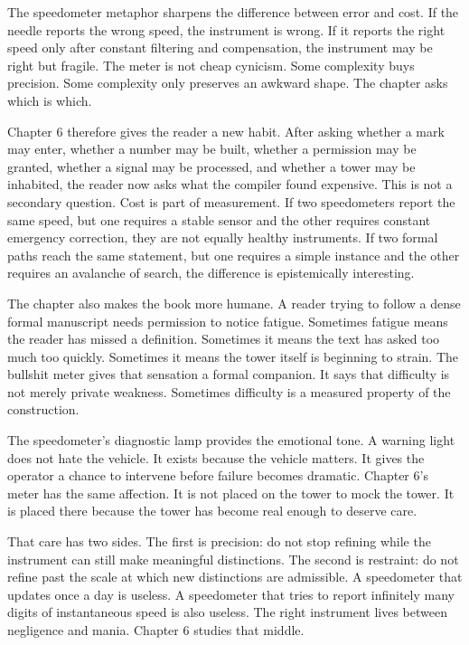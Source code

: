 The speedometer metaphor sharpens the difference between error and cost. If the
needle reports the wrong speed, the instrument is wrong. If it reports the right
speed only after constant filtering and compensation, the instrument may be
right but fragile. The meter is not cheap cynicism. Some complexity buys
precision. Some complexity only preserves an awkward shape. The chapter asks
which is which.

Chapter 6 therefore gives the reader a new habit. After asking whether a mark
may enter, whether a number may be built, whether a permission may be granted,
whether a signal may be processed, and whether a tower may be inhabited, the
reader now asks what the compiler found expensive. This is not a secondary
question. Cost is part of measurement. If two speedometers report the same
speed, but one requires a stable sensor and the other requires constant
emergency correction, they are not equally healthy instruments. If two formal
paths reach the same statement, but one requires a simple instance and the
other requires an avalanche of search, the difference is epistemically
interesting.

The chapter also makes the book more humane. A reader trying to follow a dense
formal manuscript needs permission to notice fatigue. Sometimes fatigue means
the reader has missed a definition. Sometimes it means the text has asked too
much too quickly. Sometimes it means the tower itself is beginning to strain.
The bullshit meter gives that sensation a formal companion. It says that
difficulty is not merely private weakness. Sometimes difficulty is a measured
property of the construction.

The speedometer's diagnostic lamp provides the emotional tone. A warning light
does not hate the vehicle. It exists because the vehicle matters. It gives the
operator a chance to intervene before failure becomes dramatic. Chapter 6's
meter has the same affection. It is not placed on the tower to mock the tower.
It is placed there because the tower has become real enough to deserve care.

That care has two sides. The first is precision: do not stop refining while the
instrument can still make meaningful distinctions. The second is restraint: do
not refine past the scale at which new distinctions are admissible. A
speedometer that updates once a day is useless. A speedometer that tries to
report infinitely many digits of instantaneous speed is also useless. The right
instrument lives between negligence and mania. Chapter 6 studies that middle.

